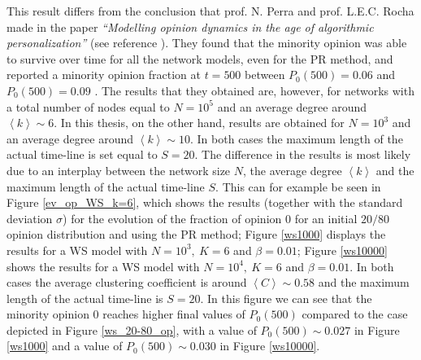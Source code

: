 \documentclass[11 pt , letterpaper , twoside , openright]{book}
\begin{document}
This result differs from the conclusion that prof. N. Perra and prof. L.E.C. Rocha made in the paper \textit{``Modelling opinion dynamics in the age of algorithmic personalization''} (see reference \cite{Perra2019}). They found that the minority opinion was able to survive over time for all the network models, even for the PR method, and reported a minority opinion fraction at $t=500$ between $P_0(500) = 0.06$ and $P_0(500) = 0.09$ \cite{Perra2019}. The results that they obtained are, however, for networks with a total number of nodes equal to $N = 10^5$ and an average degree around $\left<k\right> \sim 6$. In this thesis, on the other hand, results are obtained for $N=10^3$ and an average degree around $\left<k\right> \sim 10$. In both cases the maximum length of the actual time-line is set equal to $S=20$. The difference in the results is most likely due to an interplay between the network size $N$, the average degree $\left<k\right>$ and the maximum length of the actual time-line $S$. This can for example be seen in Figure \ref{ev_op_WS_k=6}, which shows the results (together with the standard deviation $\sigma$) for the evolution of the fraction of opinion 0 for an initial $20/80$ opinion distribution and using the PR method; Figure \ref{ws1000} displays the results for a WS model with $N=10^3,\ K=6$ and $\beta=0.01$; Figure \ref{ws10000} shows the results for a WS model with $N=10^4,\ K=6$ and $\beta=0.01$. In both cases the average clustering coefficient is around $\left<C\right> \sim 0.58$ and the maximum length of the actual time-line is $S=20$. In this figure we can see that the minority opinion 0 reaches higher final values of $P_0(500)$ compared to the case depicted in Figure \ref{ws_20-80_op}, with a value of $P_0(500) \sim 0.027$ in Figure \ref{ws1000} and a value of $P_0(500) \sim 0.030$ in Figure \ref{ws10000}.
\end{document}
